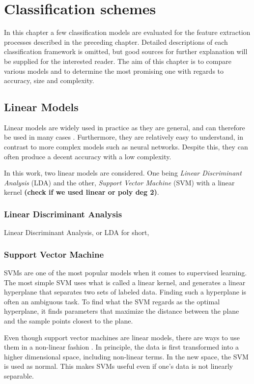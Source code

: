 \chapter{Classification schemes}
In this chapter a few classification models are evaluated for the feature extraction processes described in the preceding chapter. Detailed descriptions of each classification framework is omitted, but good sources for further explanation will be supplied for the interested reader. The aim of this chapter is to compare various models and to determine the most promising one with regards to accuracy, size and complexity. 

\section{Linear Models}
Linear models are widely used in practice as they are general, and can therefore be used in many cases \citep{shalev-shwartz_ben-david_2016}.  Furthermore, they are relatively easy to understand, in contrast to more complex models such as neural networks. Despite this, they can often produce a decent accuracy with a low complexity.

In this work, two linear models are considered. One being \emph{Linear Discriminant Analysis} (LDA) and the other, \emph{Support Vector Machine} (SVM) with a linear kernel \textbf{(check if we used linear or poly deg 2)}. 

\subsection*{Linear Discriminant Analysis}
Linear Discriminant Analysis, or LDA for short, 

\subsection*{Support Vector Machine}
SVMs are one of the most popular models when it comes to supervised learning. The most simple SVM uses what is called a linear kernel, and generates a linear hyperplane that separates two sets of labeled data. Finding such a hyperplane is often an ambiguous task. To find what the SVM regards as the optimal hyperplane, it finds parameters that maximize the distance between the plane and the sample points closest to the plane.

Even though support vector machines are linear models, there are ways to use them in a non-linear fashion \citep{xia_2016}. In principle, the data is first transformed into a higher dimensional space, including non-linear terms. In the new space, the SVM is used as normal. This makes SVMs useful even if one's data is not linearly separable.


